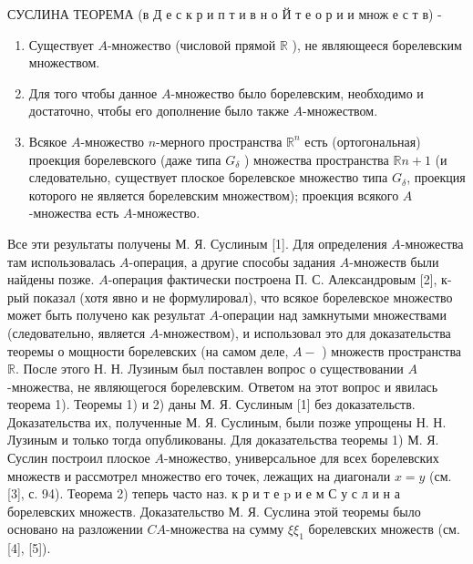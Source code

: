 \documentclass[10pt]{article}
\begin{document}
СУСЛИНА ТЕОРЕМА (в Д е с к р и п т и в н о Й т е о р и и множ е с т в) -



\begin{enumerate}

  \item Существует $A$-множество (числовой прямой $\mathbb{R}$ ), не являющееся борелевским множеством.



  \item Для того чтобы данное $A$-множество было борелевским, необходимо и достаточно, чтобы его дополнение было также $A$-множеством.



  \item Всякое $A$-множество $n$-мерного пространства $\mathbb{R}^{n}$ есть (ортогональная) проекция борелевского (даже типа $G_{\delta}$ ) множества пространства $\mathbb{R} n+1$ (и следовательно, существует плоское борелевское множество типа $G_{\delta}$, проекция которого не является борелевским множеством); проекция всякого $A$-множества есть $A$-множество.



\end{enumerate}



Все эти результаты получены М. Я. Суслиным [1]. Для определения $A$-множества там использовалась $A$-операция, а другие способы задания $A$-множеств были найдены позже. $A$-операция фактически построена П. С. Александровым [2], к-рый показал (хотя явно и не формулировал), что всякое борелевское множество может быть получено как результат $A$-операции над замкнутыми множествами (следовательно, является $A$-множеством), и использовал это для доказательства теоремы о мощности борелевских (на самом деле, $A-$ ) множеств пространства $\mathbb{R}$. После этого Н. Н. Лузиным был поставлен вопрос о существовании $A$-множества, не являющегося борелевским. Ответом на этот вопрос и явилась теорема 1). Теоремы 1) и 2) даны М. Я. Суслиным [1] без доказательств. Доказательства их, полученные М. Я. Суслиным, были позже упрощены Н. Н. Лузиным и только тогда опубликованы. Для доказательства теоремы 1) М. Я. Суслин построил плоское $A$-множество, универсальное для всех борелевских множеств и рассмотрел множество его точек, лежащих на диагонали $x=y$ (см. [3], с. 94). Теорема 2) теперь часто наз. к р и т е $\mathrm{p}$ и е м С у с л и н а борелевских множеств. Доказательство М. Я. Суслина этой теоремы было основано на разложении $C A$-множества на сумму $\xi \xi_{1}$ борелевских множеств (см. [4], [5]).
\end{document}
